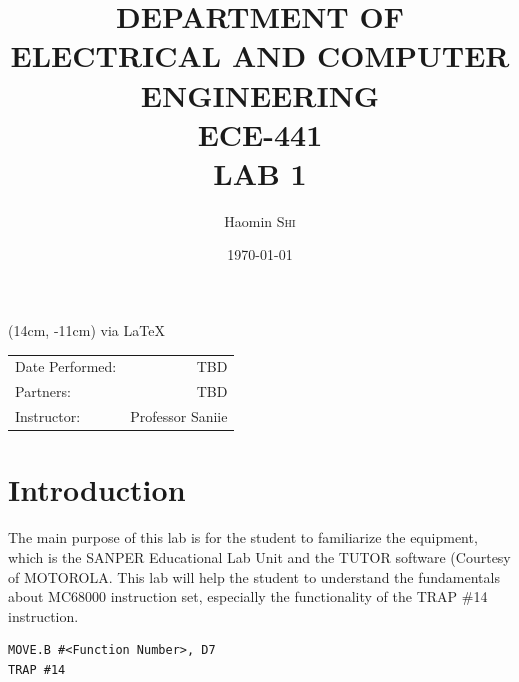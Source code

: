 \documentclass{article}
\title{DEPARTMENT OF ELECTRICAL AND COMPUTER ENGINEERING \\ ECE-441 \\ LAB 1} %
\author{Haomin \textsc{Shi}} %
\date{\today} %
\begin{document}
\maketitle %

\begin{textblock*}{3cm}(14cm, -11cm)
	{via  \LaTeX }
\end{textblock*}



\begin{center}
\begin{tabular}{l r}
Date Performed: & TBD \\ %
Partners: & TBD \\ %
Instructor: & Professor Saniie %
\end{tabular}
\end{center}



\section{Introduction}

The main purpose of this lab is for the student to familiarize the equipment, which is the SANPER Educational Lab Unit and the TUTOR software (Courtesy of MOTOROLA\textregistered. This lab will help the student to understand the fundamentals about MC68000 instruction set, especially the functionality of the TRAP \#14 instruction.

\begin{verbatim}MOVE.B #<Function Number>, D7
TRAP #14
\end{verbatim}

\end{document}
